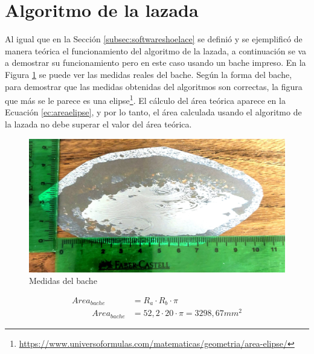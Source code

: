 \section{Algoritmo de la lazada}
\label{sec:expshoelace}
Al igual que en la Sección \ref{subsec:softwareshoelace} se definió y se ejemplificó de manera teórica el funcionamiento del algoritmo de la lazada, a continuación se va a demostrar su funcionamiento pero en este caso usando un bache impreso. En la Figura \ref{fig:explazadamedidas} se puede ver las medidas reales del bache. Según la forma del bache, para demostrar que las medidas obtenidas del algoritmos son correctas, la figura que más se le parece es una elipse\footnote{\url{https://www.universoformulas.com/matematicas/geometria/area-elipse/}}. El cálculo del área teórica aparece en la Ecuación \ref{ec:areaelipse}, y por lo tanto, el área calculada usando el algoritmo de la lazada no debe superar el valor del área teórica. 

\begin{figure} [h!]
	\begin{center}
			\includegraphics[width=12cm]{figs/cap7/memidasbacheteorico.jpeg}
		\end{center}
	\caption{Medidas del bache}
	\label{fig:explazadamedidas}
\end{figure}


\begin{myequation}[h]
	\begin{align}
		Area_{bache} &= R_a \cdot R_b \cdot \pi 
		\nonumber\\
		\hspace{1cm}
		Area_{bache} &= 52,2 \cdot 20 \cdot \pi = 3298,67 mm^{2}
		\nonumber
	\end{align}
	\caption[Fórmula para calcular el área de una elipse]{Fórmula para calcular el área de una elipse}
	\label{ec:areaelipse}
\end{myequation}


